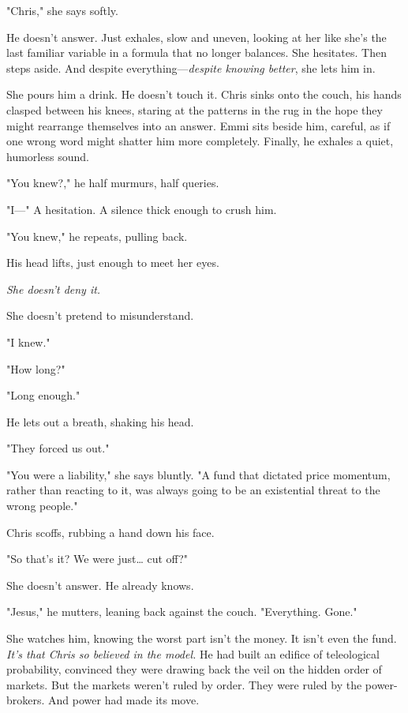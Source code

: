 "Chris," she says softly.  

He doesn’t answer. Just exhales, slow and uneven, looking at her like she’s the last familiar variable in a formula that no longer balances.  She hesitates. Then steps aside. And despite everything—\textit{despite knowing better}, she lets him in.  

\smallskip

She pours him a drink. He doesn’t touch it.  Chris sinks onto the couch, his hands clasped between his knees, staring at the patterns in the rug in the hope they might rearrange themselves into an answer.  Emmi sits beside him, careful, as if one wrong word might shatter him more completely. Finally, he exhales a quiet, humorless sound.  

"You knew?," he half murmurs, half queries.  

\smallskip

"I—" A hesitation. A silence thick enough to crush him.  

\smallskip

"You knew," he repeats, pulling back.  

His head lifts, just enough to meet her eyes.  

\smallskip

\textit{She doesn’t deny it.}  

She doesn’t pretend to misunderstand.  

"I knew."

"How long?"  

"Long enough." 

\smallskip

He lets out a breath, shaking his head.  

"They forced us out." 

"You were a liability," she says bluntly. "A fund that dictated price momentum, rather than reacting to it, was always going to be an existential threat to the wrong people."

Chris scoffs, rubbing a hand down his face.  

"So that’s it? We were just… cut off?"

She doesn’t answer. He already knows.  

\smallskip

\noindent
"Jesus," he mutters, leaning back against the couch. "Everything. Gone." 

\bigskip

She watches him, knowing the worst part isn’t the money. It isn’t even the fund.  \textit{It’s that Chris so believed in the model.}  He had built an edifice of teleological probability, convinced they were drawing back the veil on the hidden order of markets. But the markets weren’t ruled by order.  They were ruled by the power-brokers. And power had made its move.  

